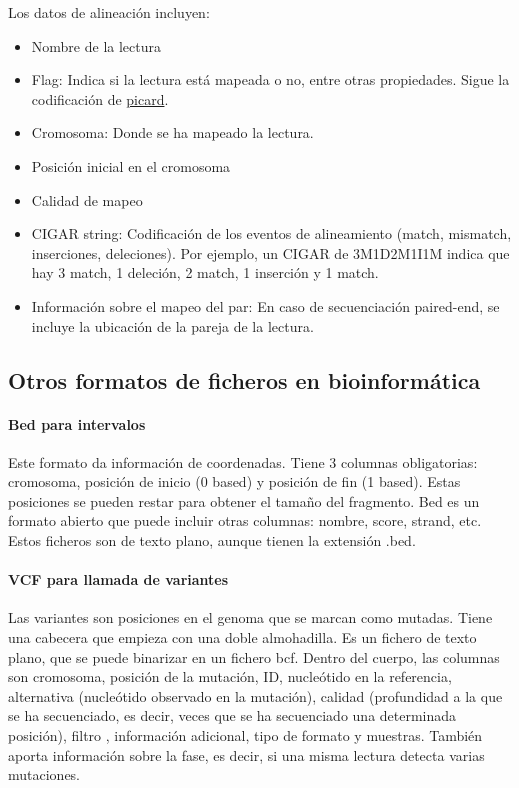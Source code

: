 \begin{itemize}
Los datos de alineación incluyen: 
\begin{itemize} 
\item Nombre de la lectura 
\item Flag: Indica si la lectura está mapeada o no, entre otras propiedades. Sigue la codificación de \href{https://broadinstitute.github.io/picard/explain-flags.html}{picard}.
\item Cromosoma: Donde se ha mapeado la lectura. 
\item Posición inicial en el cromosoma 
\item Calidad de mapeo 
\item CIGAR string: Codificación de los eventos de alineamiento (match, mismatch, inserciones, deleciones). Por ejemplo, un CIGAR de 3M1D2M1I1M indica que hay 3 match, 1 deleción, 2 match, 1 inserción y 1 match.
\item Información sobre el mapeo del par: En caso de secuenciación paired-end, se incluye la ubicación de la pareja de la lectura. 
\end{itemize}

\subsection{Otros formatos de ficheros en bioinformática}
\paragraph{Bed para intervalos}
Este formato da información de coordenadas. Tiene 3 columnas obligatorias: cromosoma, posición de inicio (0 based) y posición de fin (1 based). Estas posiciones se pueden restar para obtener el tamaño del fragmento. Bed es un formato abierto que puede incluir otras columnas: nombre, score, strand, etc. Estos ficheros son de texto plano, aunque tienen la extensión .bed. 

\paragraph{VCF para llamada de variantes}
Las variantes son posiciones en el genoma que se marcan como mutadas. Tiene una cabecera que empieza con una doble almohadilla. Es un fichero de texto plano, que se puede binarizar en un fichero bcf. Dentro del cuerpo, las columnas son cromosoma, posición de la mutación, ID, nucleótido en la referencia, alternativa (nucleótido observado en la mutación), calidad (profundidad a la que se ha secuenciado, es decir, veces que se ha secuenciado una determinada posición), filtro , información adicional, tipo de formato y muestras. También aporta información sobre la fase, es decir, si una misma lectura detecta varias mutaciones.


\end{itemize}
